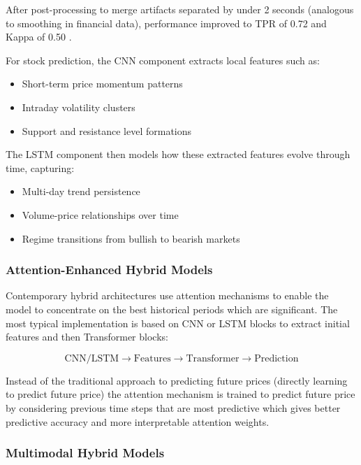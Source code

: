 After post-processing to merge artifacts separated by under 2 seconds (analogous to smoothing in financial data), performance improved to TPR of 0.72 and Kappa of 0.50 \cite{eda2023}.

For stock prediction, the CNN component extracts local features such as:
\begin{itemize}
    \item Short-term price momentum patterns
    \item Intraday volatility clusters
    \item Support and resistance level formations
\end{itemize}

The LSTM component then models how these extracted features evolve through time, capturing:
\begin{itemize}
    \item Multi-day trend persistence
    \item Volume-price relationships over time
    \item Regime transitions from bullish to bearish markets
\end{itemize}

\subsubsection{Attention-Enhanced Hybrid Models}

Contemporary hybrid architectures use attention mechanisms to enable the model to concentrate on the best historical periods which are significant. The most typical implementation is based on CNN or LSTM blocks to extract initial features and then Transformer blocks:

\begin{equation}
\text{CNN/LSTM} \rightarrow \text{Features} \rightarrow \text{Transformer} \rightarrow \text{Prediction}
\end{equation}

Instead of the traditional approach to predicting future prices (directly learning to predict future price) the attention mechanism is trained to predict future price by considering previous time steps that are most predictive which gives better predictive accuracy and more interpretable attention weights.


\subsubsection{Multimodal Hybrid Models}

